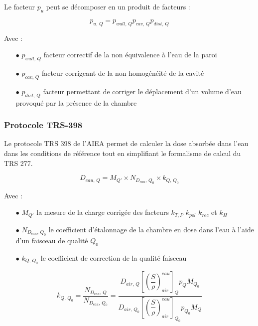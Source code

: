 \documentclass{article}
\begin{document}
Le facteur $p_u$ peut se décomposer en un produit de facteurs :

\begin{equation}
  p_{u,\, Q} = p_{wall,\, Q} p_{cav,\, Q} p_{dist,\, Q}
  \label{eq_pu}
\end{equation}

Avec :
\begin{itemize}
  \item[$\bullet$] $p_{wall,\, Q}$ facteur correctif de la non équivalence à l'eau de la paroi
  \item[$\bullet$] $p_{cav,\, Q}$ facteur corrigeant de la non homogénéité de la cavité
  \item[$\bullet$] $p_{dist,\, Q}$ facteur permettant de corriger le déplacement d'un volume d'eau provoqué par la présence de la chambre
\end{itemize}

\subsubsection{Protocole TRS-398}

Le protocole TRS 398 de l'AIEA \cite{international2001iaea} permet de calculer la dose absorbée dans l'eau dans les conditions de référence tout en simplifiant le formalisme de calcul du TRS 277.

\begin{equation}
  D_{eau,\, Q} = M_{Q'} \times N_{D_{eau},\, Q_0} \times k_{Q,\, Q_0}
  \label{eq_dose_398}
\end{equation}

Avec :
\begin{itemize}
  \item[$\bullet$] $M_{Q'}$ la mesure de la charge corrigée des facteurs $k_{T,P}$ $k_{pol}$ $k_{rec}$ et $k_H$
  \item[$\bullet$] $N_{D_{eau},\, Q_0}$ le coefficient d'étalonnage de la chambre en dose dans l'eau à l'aide d'un faisceau de qualité $Q_0$
  \item[$\bullet$] $k_{Q,\, Q_0}$ le coefficient de correction de la qualité faisceau
\end{itemize}

\begin{equation}
  k_{Q,\, Q_0} = \dfrac{N_{D_{eau},\, Q}}{N_{D_{eau},\, Q_0}} = \dfrac{D_{air,\, Q} \left[\left(\dfrac{S}{\rho}\right) ^{eau}_{air}\right]_Q p_Q M_{Q_0}}{D_{air,\, Q_0 } \left[\left(\dfrac{S}{\rho}\right) ^{eau}_{air}\right]_{Q_0} p_{Q_0} M_Q}
\end{equation}
\end{document}
